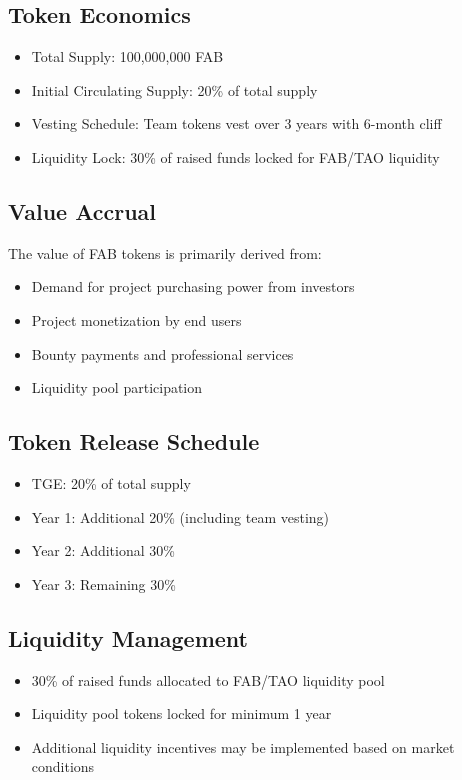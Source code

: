 \subsection*{Token Economics}
\begin{itemize}[leftmargin=*]
    \item Total Supply: 100,000,000 FAB
    \item Initial Circulating Supply: 20\% of total supply
    \item Vesting Schedule: Team tokens vest over 3 years with 6-month cliff
    \item Liquidity Lock: 30\% of raised funds locked for FAB/TAO liquidity
\end{itemize}

\subsection*{Value Accrual}
The value of FAB tokens is primarily derived from:
\begin{itemize}[leftmargin=*]
    \item Demand for project purchasing power from investors
    \item Project monetization by end users
    \item Bounty payments and professional services
    \item Liquidity pool participation
\end{itemize}

\subsection*{Token Release Schedule}
\begin{itemize}[leftmargin=*]
    \item TGE: 20\% of total supply
    \item Year 1: Additional 20\% (including team vesting)
    \item Year 2: Additional 30\%
    \item Year 3: Remaining 30\%
\end{itemize}

\subsection*{Liquidity Management}
\begin{itemize}[leftmargin=*]
    \item 30\% of raised funds allocated to FAB/TAO liquidity pool
    \item Liquidity pool tokens locked for minimum 1 year
    \item Additional liquidity incentives may be implemented based on market conditions
\end{itemize} 